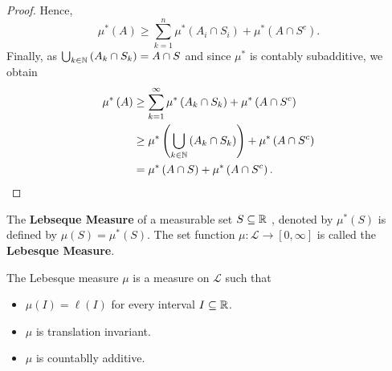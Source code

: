 \begin{proof}
Hence, \[ \mu^{*}\left( A \right) \ge \sum_{k= 1}^{n} \mu^{*}\left( A_{i} \cap S_{i} \right) + \mu^{*}\left( A \cap S^{c} \right)   .\] Finally, as \(\bigcup_{k \in \mathbb{N}} \left( A_{k} \cap S_{k} \right)= A \cap S \) and since \( \mu^{*}\) is contably subadditive, we obtain \begin{align*}
\mu^{*}\left( A \right) &\ge \sum_{k=1}^{\infty} \mu^{*}\left( A_{k} \cap S_{k} \right)  + \mu^{*}\left( A \cap S^{c} \right) \\
			&\ge \mu^{*}\left( \bigcup_{ k \in \mathbb{N}} \left( A_{k} \cap S_{k} \right)  \right)  + \mu^{*}\left( A \cap S^{c} \right) \\
			&=  \mu^{*}\left( A \cap S \right) + \mu^{*}\left( A \cap S^{c} \right).
\end{align*}
\end{proof}
\begin{definition}
	The \textbf{Lebseque Measure} of a measurable set \(S \subseteq \mathbb{R}\)	, denoted by \( \mu^{*}\left( S \right) \) is defined by \( \mu\left( S \right)  = \mu^{*}\left(S  \right) \). The set function \( \mu: \mathscr{L} \to \left[ 0, \infty \right] \) is called the \textbf{Lebesque Measure}.
\end{definition}
\begin{theorem}
	The Lebesque measure \( \mu\) is a measure on \(\mathscr{L}\) such that
	\begin{itemize}
		\item \( \mu \left( I \right) = \ell\left( I \right) \) for every interval \(I \subseteq \mathbb{R}\).
			\item \( \mu\) is translation invariant.
				\item \( \mu\) is countablly additive.
	\end{itemize}

\end{theorem}
